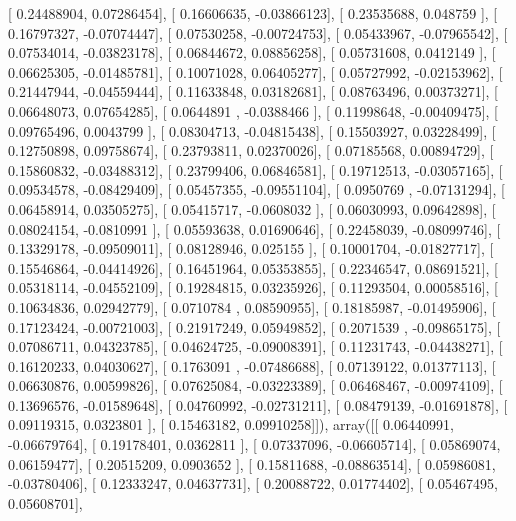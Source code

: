 \documentclass{article}
\begin{document}
       [ 0.24488904,  0.07286454],
       [ 0.16606635, -0.03866123],
       [ 0.23535688,  0.048759  ],
       [ 0.16797327, -0.07074447],
       [ 0.07530258, -0.00724753],
       [ 0.05433967, -0.07965542],
       [ 0.07534014, -0.03823178],
       [ 0.06844672,  0.08856258],
       [ 0.05731608,  0.0412149 ],
       [ 0.06625305, -0.01485781],
       [ 0.10071028,  0.06405277],
       [ 0.05727992, -0.02153962],
       [ 0.21447944, -0.04559444],
       [ 0.11633848,  0.03182681],
       [ 0.08763496,  0.00373271],
       [ 0.06648073,  0.07654285],
       [ 0.0644891 , -0.0388466 ],
       [ 0.11998648, -0.00409475],
       [ 0.09765496,  0.0043799 ],
       [ 0.08304713, -0.04815438],
       [ 0.15503927,  0.03228499],
       [ 0.12750898,  0.09758674],
       [ 0.23793811,  0.02370026],
       [ 0.07185568,  0.00894729],
       [ 0.15860832, -0.03488312],
       [ 0.23799406,  0.06846581],
       [ 0.19712513, -0.03057165],
       [ 0.09534578, -0.08429409],
       [ 0.05457355, -0.09551104],
       [ 0.0950769 , -0.07131294],
       [ 0.06458914,  0.03505275],
       [ 0.05415717, -0.0608032 ],
       [ 0.06030993,  0.09642898],
       [ 0.08024154, -0.0810991 ],
       [ 0.05593638,  0.01690646],
       [ 0.22458039, -0.08099746],
       [ 0.13329178, -0.09509011],
       [ 0.08128946,  0.025155  ],
       [ 0.10001704, -0.01827717],
       [ 0.15546864, -0.04414926],
       [ 0.16451964,  0.05353855],
       [ 0.22346547,  0.08691521],
       [ 0.05318114, -0.04552109],
       [ 0.19284815,  0.03235926],
       [ 0.11293504,  0.00058516],
       [ 0.10634836,  0.02942779],
       [ 0.0710784 ,  0.08590955],
       [ 0.18185987, -0.01495906],
       [ 0.17123424, -0.00721003],
       [ 0.21917249,  0.05949852],
       [ 0.2071539 , -0.09865175],
       [ 0.07086711,  0.04323785],
       [ 0.04624725, -0.09008391],
       [ 0.11231743, -0.04438271],
       [ 0.16120233,  0.04030627],
       [ 0.1763091 , -0.07486688],
       [ 0.07139122,  0.01377113],
       [ 0.06630876,  0.00599826],
       [ 0.07625084, -0.03223389],
       [ 0.06468467, -0.00974109],
       [ 0.13696576, -0.01589648],
       [ 0.04760992, -0.02731211],
       [ 0.08479139, -0.01691878],
       [ 0.09119315,  0.0323801 ],
       [ 0.15463182,  0.09910258]]), array([[ 0.06440991, -0.06679764],
       [ 0.19178401,  0.0362811 ],
       [ 0.07337096, -0.06605714],
       [ 0.05869074,  0.06159477],
       [ 0.20515209,  0.0903652 ],
       [ 0.15811688, -0.08863514],
       [ 0.05986081, -0.03780406],
       [ 0.12333247,  0.04637731],
       [ 0.20088722,  0.01774402],
       [ 0.05467495,  0.05608701],
\end{document}
